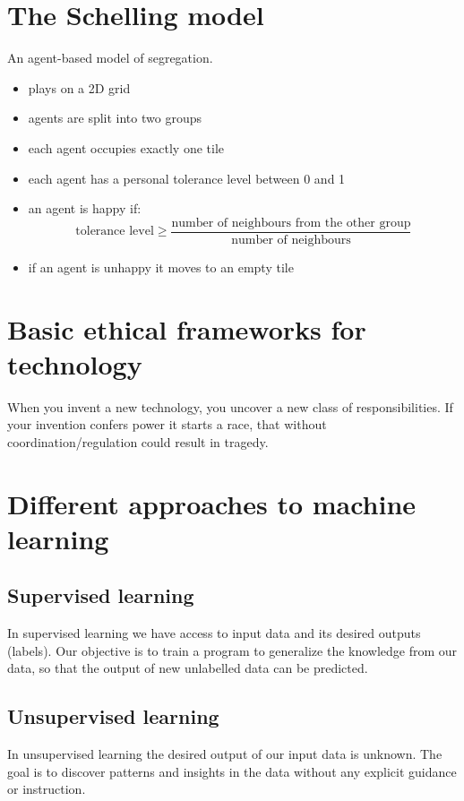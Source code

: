 \documentclass[a4paper,12pt,answers]{article}
\begin{document}
	\section{The Schelling model}
	An agent-based model of segregation.
	\begin{itemize}
		\item plays on a 2D grid
		\item agents are split into two groups
		\item each agent occupies exactly one tile
		\item each agent has a personal tolerance level between 0 and 1
		\item an agent is happy if:
		\[
		\text{tolerance level} \ge \frac{\text{number of neighbours from the other group}}{\text{number of neighbours}}
		\]
		\item if an agent is unhappy it moves to an empty tile
	\end{itemize} 
	
	

	\section{Basic ethical frameworks for technology}
	When you invent a new technology, you uncover a new class of responsibilities. If your invention confers power it starts a race, that without coordination/regulation could result in tragedy.
	
	
	
	\section{Different approaches to machine learning}
	\subsection{Supervised learning}
	In supervised learning we have access to input data and its desired outputs (labels). Our objective is to train a program to generalize the knowledge from our data, so that the output of new unlabelled data can be predicted.
	
	
	\subsection{Unsupervised learning}
	In unsupervised learning the desired output of our input data is unknown. The goal is to discover patterns and insights in the data without any explicit guidance or instruction. 
	
\end{document}
